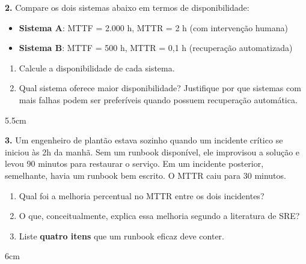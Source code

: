 \documentclass[12pt]{article}
\begin{document}
\vspace{0.5cm}

\textbf{2.} Compare os dois sistemas abaixo em termos de disponibilidade:

\begin{itemize}
  \item \textbf{Sistema A}: MTTF = 2.000 h, MTTR = 2 h (com intervenção humana)
  \item \textbf{Sistema B}: MTTF = 500 h, MTTR = 0,1 h (recuperação automatizada)
\end{itemize}

\begin{enumerate}[label=\alph*)]
  \item Calcule a disponibilidade de cada sistema.
  \item Qual sistema oferece maior disponibilidade? Justifique por que sistemas com
        mais falhas podem ser preferíveis quando possuem recuperação automática.
\end{enumerate}
\begin{resposta}{5.5cm}
\end{resposta}

\vspace{0.5cm}

\textbf{3.} Um engenheiro de plantão estava sozinho quando um incidente crítico se iniciou às
2h da manhã. Sem um runbook disponível, ele improvisou a solução e levou 90 minutos
para restaurar o serviço. Em um incidente posterior, semelhante, havia um runbook bem
escrito. O MTTR caiu para 30 minutos.

\begin{enumerate}[label=\alph*)]
  \item Qual foi a melhoria percentual no MTTR entre os dois incidentes?
  \item O que, conceitualmente, explica essa melhoria segundo a literatura de SRE?
  \item Liste \textbf{quatro itens} que um runbook eficaz deve conter.
\end{enumerate}
\begin{resposta}{6cm}
\end{resposta}

\vspace{0.5cm}
\end{document}
